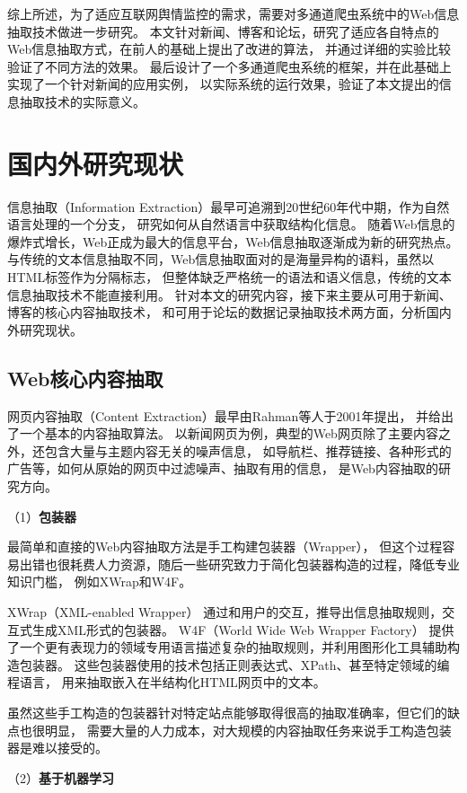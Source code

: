 综上所述，为了适应互联网舆情监控的需求，需要对多通道爬虫系统中的Web信息抽取技术做进一步研究。
本文针对新闻、博客和论坛，研究了适应各自特点的Web信息抽取方式，在前人的基础上提出了改进的算法，
并通过详细的实验比较验证了不同方法的效果。
最后设计了一个多通道爬虫系统的框架，并在此基础上实现了一个针对新闻的应用实例，
以实际系统的运行效果，验证了本文提出的信息抽取技术的实际意义。

\section{国内外研究现状}
信息抽取（Information Extraction）最早可追溯到20世纪60年代中期，作为自然语言处理的一个分支，
研究如何从自然语言中获取结构化信息。
随着Web信息的爆炸式增长，Web正成为最大的信息平台，Web信息抽取逐渐成为新的研究热点。
与传统的文本信息抽取不同，Web信息抽取面对的是海量异构的语料，虽然以HTML标签作为分隔标志，
但整体缺乏严格统一的语法和语义信息，传统的文本信息抽取技术不能直接利用。
针对本文的研究内容，接下来主要从可用于新闻、博客的核心内容抽取技术，
和可用于论坛的数据记录抽取技术两方面，分析国内外研究现状。

\subsection{Web核心内容抽取}
网页内容抽取（Content Extraction）最早由Rahman等人于2001年提出，
并给出了一个基本的内容抽取算法。
以新闻网页为例，典型的Web网页除了主要内容之外，还包含大量与主题内容无关的噪声信息，
如导航栏、推荐链接、各种形式的广告等，如何从原始的网页中过滤噪声、抽取有用的信息，
是Web内容抽取的研究方向。

（1）\textbf{包装器}

最简单和直接的Web内容抽取方法是手工构建包装器（Wrapper），
但这个过程容易出错也很耗费人力资源，随后一些研究致力于简化包装器构造的过程，降低专业知识门槛，
例如XWrap和W4F。

XWrap（XML-enabled Wrapper）
通过和用户的交互，推导出信息抽取规则，交互式生成XML形式的包装器。
W4F（World Wide Web Wrapper Factory）
提供了一个更有表现力的领域专用语言描述复杂的抽取规则，并利用图形化工具辅助构造包装器。
这些包装器使用的技术包括正则表达式、XPath、甚至特定领域的编程语言，
用来抽取嵌入在半结构化HTML网页中的文本。

虽然这些手工构造的包装器针对特定站点能够取得很高的抽取准确率，但它们的缺点也很明显，
需要大量的人力成本，对大规模的内容抽取任务来说手工构造包装器是难以接受的。

（2）\textbf{基于机器学习}

